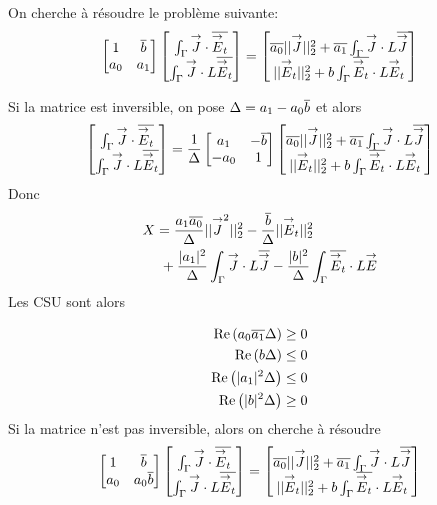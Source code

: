 		On cherche à résoudre le problème suivante:
		\[
			\begin{bmatrix}
				1 & \conj{b} \\
				a_0 & a_1
			\end{bmatrix}
			\begin{bmatrix}
				\int_\Gamma \vJ \cdot \conj{\vE_t} \\
				\int_\Gamma \vJ\cdot L\conj{\vE_t}
			\end{bmatrix}
			=
			\begin{bmatrix}
				\conj{a_0}||\vJ||_2^2 + \conj{a_1}\int_\Gamma \vJ \cdot L\conj{\vJ} \\
				||\vE_t||_2^2 + b\int_\Gamma \conj{\vE_t} \cdot L\vE_t
			\end{bmatrix}
		\]

		Si la matrice est inversible, on pose \(\Delta = a_1 - a_0\conj{b}\) et alors
		\[
		\begin{bmatrix}
			\int_\Gamma \vJ \cdot \conj{\vE_t} \\
			\int_\Gamma \vJ\cdot L\conj{\vE_t}
		\end{bmatrix}
		=\frac{1}{\Delta}
		\begin{bmatrix}
			a_1 & -\conj{b} \\
			-a_0 & 1
		\end{bmatrix}
		\begin{bmatrix}
			\conj{a_0}||\vJ||_2^2 + \conj{a_1}\int_\Gamma \vJ \cdot L\conj{\vJ} \\
			||\vE_t||_2^2 + b\int_\Gamma \conj{\vE_t} \cdot L\vE_t
		\end{bmatrix}
		\]
		Donc
		\begin{align*}
			X &=  \frac{a_1\conj{a_0}}{\Delta}||\vJ^2||_2^2 - \frac{\conj{b}}{\Delta}||\vE_t||_2^2 \\
			&~+\frac{|a_1|^2}{\Delta}\int_\Gamma\vJ\cdot L \conj{\vJ} - \frac{|b|^2}{\Delta}\int_\Gamma\conj{\vE_t}\cdot L\vE
		\end{align*}
		Les CSU sont alors

			\begin{align}
			\Re\left(a_0\conj{a_1}\Delta\right) &\ge 0\\
			\Re\left(b\Delta\right) &\le 0\\
			\Re\left(|a_1|^2\Delta\right) &\le 0\\
			\Re\left(|b|^2\Delta\right) &\ge 0
		\end{align}
		Si la matrice n'est pas inversible, alors on cherche à résoudre
		\[
			\begin{bmatrix}
				1 & \conj{b} \\
				a_0 & a_0\conj{b}
			\end{bmatrix}
			\begin{bmatrix}
				\int_\Gamma \vJ \cdot \conj{\vE_t} \\
				\int_\Gamma \vJ \cdot L\conj{\vE_t}
			\end{bmatrix}
			=
			\begin{bmatrix}
				\conj{a_0}||\vJ||_2^2 + \conj{a_1}\int_\Gamma \vJ \cdot L\conj{\vJ} \\
				||\vE_t||_2^2 + b\int_\Gamma \conj{\vE_t} \cdot L\vE_t
			\end{bmatrix}
		\]

